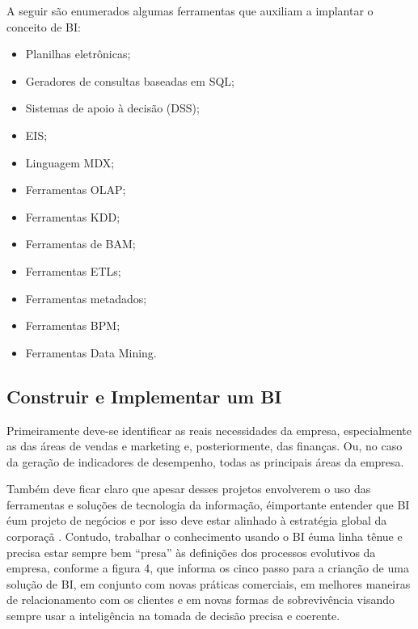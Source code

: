 A seguir são enumerados algumas ferramentas que auxiliam a implantar o conceito de BI:

\begin{itemize}
    \item Planilhas eletrônicas;
    \item Geradores de consultas baseadas em SQL;
    \item Sistemas de apoio à decisão (DSS);
    \item EIS;
    \item Linguagem MDX;
    \item Ferramentas OLAP;
    \item Ferramentas KDD;
    \item Ferramentas de BAM;
    \item Ferramentas ETLs;
    \item Ferramentas metadados;
    \item Ferramentas BPM;
    \item Ferramentas Data Mining.
\end{itemize}

\subsection{Construir e Implementar um BI}

Primeiramente deve-se identificar as reais necessidades da empresa, especialmente as das áreas de vendas e marketing e, posteriormente, das finanças. Ou, no caso da geração de indicadores de desempenho, todas as principais áreas da empresa. 

Também deve ficar claro que apesar desses projetos envolverem o uso das ferramentas e soluções de tecnologia da informação, \'{e}importante entender que BI \'{e}um projeto de negócios e por isso deve estar alinhado à estratégia global da corporaçã
.
Contudo, trabalhar o conhecimento usando o BI \'{e}uma linha tênue e precisa estar sempre bem “presa” às definições dos processos evolutivos da empresa, conforme a figura 4, que informa os cinco passo para a crian\c{c}\~{a}o de uma solu\c{c}\~{a}o de BI, em conjunto com novas práticas comerciais, em melhores maneiras de relacionamento com os clientes e em novas formas de sobrevivência visando sempre usar a inteligência na tomada de decisão precisa e coerente.

